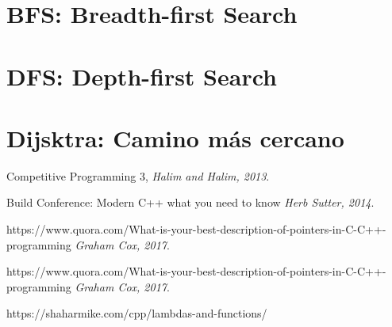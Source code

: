 \documentclass[12pt, fleqn]{report}                             %
\theoremstyle{break}                                            %
\begin{document}
        \section{BFS: Breadth-first Search}


        \section{DFS: Depth-first Search}

        \section{Dijsktra: Camino más cercano}



\begin{thebibliography}{10}

        Competitive Programming 3,
        \textit{Halim and Halim, 2013}. 


        Build Conference: Modern C++ what you need to know
        \textit{Herb Sutter, 2014}. 

        https://www.quora.com/What-is-your-best-description-of-pointers-in-C-C++-programming
        \textit{Graham Cox, 2017}. 

        https://www.quora.com/What-is-your-best-description-of-pointers-in-C-C++-programming
        \textit{Graham Cox, 2017}. 

        https://shaharmike.com/cpp/lambdas-and-functions/

        


\end{thebibliography}
\end{document}
